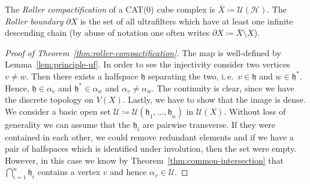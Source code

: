 \begin{defin}
  The \emph{Roller compactification} of a CAT(0) cube complex is \(\bar X \coloneqq \mathcal{U}(\mathcal{H})\). The \emph{Roller boundary} \(\partial X\) is the set of all ultrafilters which have at least one infinite descending chain (by abuse of notation one often writes \(\partial X \coloneqq \bar X \setminus X\)).
\end{defin}

\begin{proof}[Proof of Theorem~\ref{thm:roller-compactification}]
  The map is well-defined by Lemma~\ref{lem:principle-uf}. In order to see the injectivity consider two vertices \(v \neq w\). Then there exists a halfspace \(\mathfrak{h}\) separating the two, i.\,e.\ \(v \in \mathfrak{h}\) and \(w \in \mathfrak{h}^\ast\). Hence, \(\mathfrak{h} \in \alpha_v\) and \(\mathfrak{h}^\ast \in \alpha_w\) and \(\alpha_v \neq \alpha_w\). The continuity is clear, since we have the discrete topology on \(V(X)\). Lastly, we have to show that the image is dense. We consider a basic open set \(\mathcal{U} \coloneqq \mathcal{U}(\mathfrak{h}_1, \dots, \mathfrak{h}_n)\) in \(\mathcal{U}(X)\). Without loss of generality we can assume that the \(\mathfrak{h}_i\) are pairwise transverse. If they were contained in each other, we could remove redundant elements and if we have a pair of halfspaces which is identified under involution, then the set were empty. However, in this case we know by Theorem~\ref{thm:common-intersection} that \(\bigcap_{i=1}^n \mathfrak{h}_i\) contains a vertex \(v\) and hence \(\alpha_v \in \mathcal{U}\).
\end{proof}

